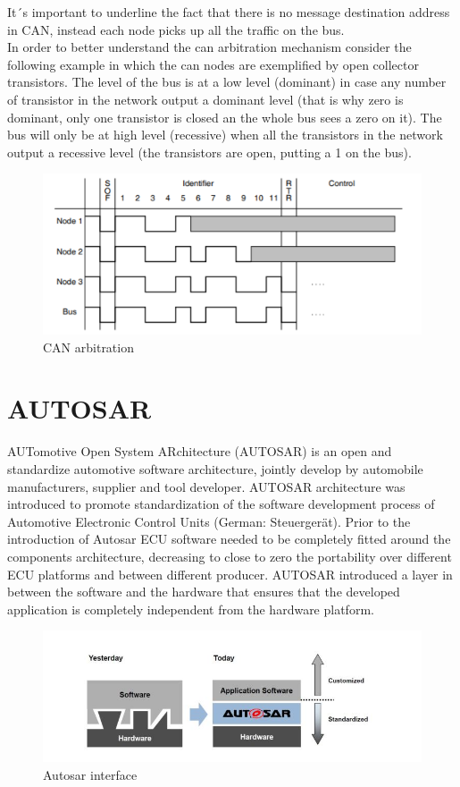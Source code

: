 \documentclass[../main.tex]{subfiles}
\begin{document}
It´s important to underline the fact that there is no message destination address in CAN, instead each node picks up all the traffic on the bus.\\
In order to better understand the can arbitration mechanism consider the following example in which the can nodes are exemplified by open collector transistors. 
The level of the bus is at a low level (dominant) in case any number of transistor in the network output a dominant level (that is why zero is dominant, only one transistor is closed an the whole bus sees a zero on it). The bus will only be at high level (recessive) when all the transistors in the network output a recessive level (the transistors are open, putting a 1 on the bus).
\begin{figure}[h]
    \centering
    \includegraphics[width=\linewidth]{images_folder/can_arbitration.png}
    \caption{CAN arbitration}
    \label{fig:CANABR}
\end{figure}
\section{AUTOSAR}
AUTomotive Open System ARchitecture (AUTOSAR) is an open and standardize automotive software architecture, jointly develop by automobile manufacturers, supplier and tool developer. AUTOSAR architecture was introduced to promote standardization of the software development process of Automotive Electronic Control Units (German: Steuergerät). Prior to the introduction of Autosar ECU software needed to be completely fitted around the components architecture, decreasing to close to zero the portability over different ECU platforms and between different producer. 
AUTOSAR introduced a layer in between the software and the hardware that ensures that the developed application is completely independent from the hardware platform. 
\begin{figure}[h]
    \centering
    \includegraphics[width=\linewidth]{images_folder/autosarcapture.jpg}
    \caption{Autosar interface}
    \label{fig:AUTCA}
\end{figure}
\end{document}
